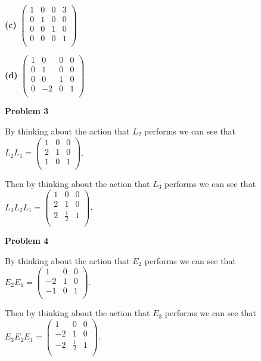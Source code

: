\documentclass[oneside,12pt]{amsart}
\begin{document}
\textbf{(c)}
$
\begin{pmatrix}
1 & 0 & 0 & 3 \\
0 & 1 & 0 & 0 \\
0 & 0 & 1 & 0 \\
0 & 0 & 0 & 1 \\
\end{pmatrix}
$

\bigskip

\textbf{(d)}
$
\begin{pmatrix}
1 & 0 & 0 & 0 \\
0 & 1 & 0 & 0 \\
0 & 0 & 1 & 0 \\
0 & -2 & 0 & 1 \\
\end{pmatrix}
$

\bigskip


\textbf{Problem 3}

\bigskip

By thinking about the action that $L_2$ performs we can see that
$L_2 L_1 =
\begin{pmatrix}
1 & 0 & 0\\
2 & 1 & 0\\
1 & 0 & 1\\
\end{pmatrix}
$.

\bigskip

Then by thinking about the action that $L_3$ performs we can see that
$L_3 L_2 L_1=
\begin{pmatrix}
1 &            0 & 0\\
2 &            1 & 0\\
2 & \frac{1}{2} & 1\\
\end{pmatrix}
$.


\bigskip


\textbf{Problem 4}

\bigskip

By thinking about the action that $E_2$ performs we can see that
$E_2 E_1 =
\begin{pmatrix}
 1   & 0  & 0\\
-2   & 1  & 0\\
-1   & 0  & 1\\
\end{pmatrix}
$.

\bigskip

Then by thinking about the action that $E_3$ performs we can see that
$E_3 E_2 E_1=
\begin{pmatrix}
 1   & 0           & 0\\
-2   & 1           & 0\\
-2   & \frac{1}{2} & 1\\
\end{pmatrix}
$.
\end{document}
